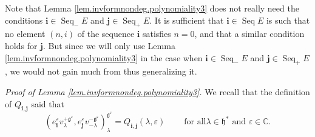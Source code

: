 \documentclass
[numbers=enddot,12pt,final,onecolumn,german,notitlepage]{scrartcl}%
\theoremstyle{definition}
\begin{document}
Note that Lemma \ref{lem.invformnondeg.polynomiality3} does not really need
the conditions $\mathbf{i}\in\operatorname*{Seq}\nolimits_{-}E$ and
$\mathbf{j}\in\operatorname*{Seq}\nolimits_{+}E$. It is sufficient that
$\mathbf{i}\in\operatorname*{Seq}E$ is such that no element $\left(
n,i\right)  $ of the sequence $\mathbf{i}$ satisfies $n=0$, and that a similar
condition holds for $\mathbf{j}$. But since we will only use Lemma
\ref{lem.invformnondeg.polynomiality3} in the case when $\mathbf{i}%
\in\operatorname*{Seq}\nolimits_{-}E$ and $\mathbf{j}\in\operatorname*{Seq}%
\nolimits_{+}E$, we would not gain much from thus generalizing it.

\textit{Proof of Lemma \ref{lem.invformnondeg.polynomiality3}.} We recall that
the definition of $Q_{\mathbf{i},\mathbf{j}}$ said that%
\begin{equation}
\left(  e_{\mathbf{i}}^{\varepsilon}v_{\lambda}^{+\mathfrak{g}^{\varepsilon}%
},e_{\mathbf{j}}^{\varepsilon}v_{-\lambda}^{-\mathfrak{g}^{\varepsilon}%
}\right)  _{\lambda}^{\mathfrak{g}^{\varepsilon}}=Q_{\mathbf{i},\mathbf{j}%
}\left(  \lambda,\varepsilon\right)  \ \ \ \ \ \ \ \ \ \ \text{for all
}\lambda\in\mathfrak{h}^{\ast}\text{ and }\varepsilon\in\mathbb{C}.
\label{pf.invformnondeg.polynomiality3.1}%
\end{equation}
\end{document}
